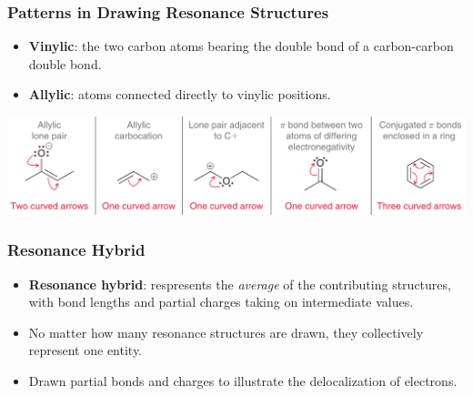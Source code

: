 \documentclass[12pt,a4paper]{article}
\begin{document}
\begin{itemize}
    \subsubsection{Patterns in Drawing Resonance Structures}
    \begin{itemize}
        \item \textbf{Vinylic}: the two carbon atoms bearing the double bond of a carbon-carbon double bond.
        \item \textbf{Allylic}: atoms connected directly to vinylic positions.
    \end{itemize}
    \begin{center}
        \includegraphics[scale=0.4]{images/patterns.png}
    \end{center}
    \subsubsection{Resonance Hybrid}
    \begin{itemize}
        \item \textbf{Resonance hybrid}: respresents the \textit{average} of the contributing structures, with bond lengths and partial charges taking on intermediate values.
        \item No matter how many resonance structures are drawn, they collectively represent one entity.
        \item Drawn partial bonds and charges to illustrate the delocalization of electrons.
    \end{itemize}

\end{itemize}
\end{document}
